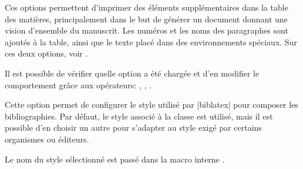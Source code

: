 \begin{noprint}
\end{noprint}

Ces options permettent d'imprimer des éléments supplémentaires dans la table des matières, principalement dans le but de générer un document donnant une vision d'ensemble du manuscrit. Les numéros et les noms des paragraphes sont ajoutés à la table, ainsi que le texte placé dans des environnements spéciaux. Sur ces deux options, voir .

\begin{developer}
Il est possible de vérifier quelle option a été chargée et d'en modifier le comportement grâce aux opérateurs: , , .
\end{developer}

\begin{noprint}
\end{noprint}

Cette option permet de configurer le style utilisé par |biblatex| pour composer les bibliographies. Par défaut, le style associé à la classe \frenchlaw est utilisé, mais il est possible d'en choisir un autre pour s'adapter au style exigé par certains organismes ou éditeurs.

\begin{developer}
Le nom du style sélectionné est passé dans la macro interne .
\end{developer}

